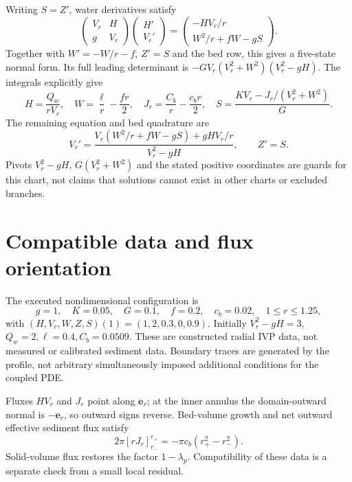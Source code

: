 \documentclass[11pt,a4paper,oneside]{report}
\numberwithin{equation}{chapter}
\begin{document}
Writing $S=Z'$, water derivatives satisfy
\begin{equation}
\begin{pmatrix}V_r&H\\g&V_r\end{pmatrix}
\begin{pmatrix}H'\\V_r'\end{pmatrix}
=\begin{pmatrix}-HV_r/r\\W^2/r+fW-gS\end{pmatrix}.
\end{equation}
Together with $W'=-W/r-f$, $Z'=S$ and the bed row, this gives a five-state
normal form. Its full leading determinant is
$-GV_r(V_r^2+W^2)(V_r^2-gH)$.
The integrals explicitly give
\begin{equation}\label{eq:annular-elimination}
H=\frac{Q_w}{rV_r},\quad W=\frac{\ell}{r}-\frac{fr}{2},\quad
J_r=\frac{C_b}{r}-\frac{c_br}{2},\quad
S=\frac{KV_r-J_r/(V_r^2+W^2)}{G}.
\end{equation}
The remaining equation and bed quadrature are
\begin{equation}\label{eq:annular-one-ode}
V_r'=\frac{V_r(W^2/r+fW-gS)+gHV_r/r}{V_r^2-gH},
\qquad Z'=S.
\end{equation}
Pivots $V_r^2-gH$, $G(V_r^2+W^2)$ and the stated positive coordinates
are guards for this chart, not claims that solutions cannot exist in
other charts or excluded branches.

\section{Compatible data and flux orientation}
The executed nondimensional configuration is
\begin{equation}\label{eq:annular-data}
g=1,\quad K=0.05,\quad G=0.1,\quad f=0.2,\quad c_b=0.02,
\quad1\le r\le1.25,
\end{equation}
with $(H,V_r,W,Z,S)(1)=(1,2,0.3,0,0.9)$.
Initially $V_r^2-gH=3$, $Q_w=2,\ell=0.4,C_b=0.0509$.
These are constructed radial IVP data, not measured or calibrated sediment
data. Boundary traces are generated by the profile, not arbitrary
simultaneously imposed additional conditions for the coupled PDE.

Fluxes $HV_r$ and $J_r$ point along $\mathbf e_r$; at the inner annulus the
domain-outward normal is $-\mathbf e_r$, so outward signs reverse.
Bed-volume growth and net outward effective sediment flux satisfy
\begin{equation}\label{eq:annular-flux}
2\pi[rJ_r]_{r_-}^{r_+}=-\pi c_b(r_+^2-r_-^2).
\end{equation}
Solid-volume flux restores the factor $1-\lambda_p$.
Compatibility of these data is a separate check from a small local residual.
\end{document}
